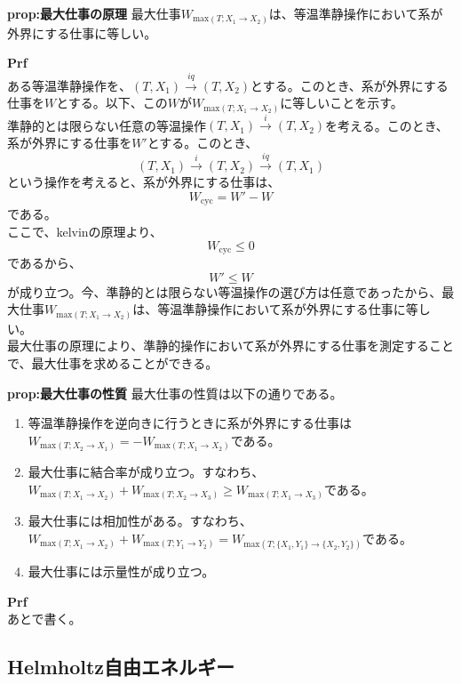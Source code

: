 \documentclass[a4paper,11pt]{jsarticle}
\begin{document}
\begin{itembox}[l]{\textbf{prop:最大仕事の原理}}
    最大仕事$W_{\text{max}(T;X_1\rightarrow X_2)}$は、等温準静操作において系が外界にする仕事に等しい。
\end{itembox}
\textbf{Prf}\\
ある等温準静操作を、$(T,X_1) \xrightarrow{iq} (T,X_2)$とする。このとき、系が外界にする仕事を$W$とする。以下、この$W$が$W_{\text{max}(T;X_1\rightarrow X_2)}$に等しいことを示す。\\
準静的とは限らない任意の等温操作$(T,X_1) \xrightarrow{i} (T,X_2)$を考える。このとき、系が外界にする仕事を$W'$とする。このとき、
\begin{equation}
    (T,X_1) \xrightarrow{i} (T,X_2) \xrightarrow{iq} (T,X_1)
\end{equation}
という操作を考えると、系が外界にする仕事は、
\begin{equation}
    W_{\text{cyc}} = W'-W
\end{equation}
である。\\
ここで、kelvinの原理より、
\begin{equation}
    W_{\text{cyc}} \leq 0
\end{equation}
であるから、
\begin{equation}
    W' \leq W
\end{equation}
が成り立つ。今、準静的とは限らない等温操作の選び方は任意であったから、最大仕事$W_{\text{max}(T;X_1\rightarrow X_2)}$は、等温準静操作において系が外界にする仕事に等しい。\\

最大仕事の原理により、準静的操作において系が外界にする仕事を測定することで、最大仕事を求めることができる。\\

\begin{itembox}[l]{\textbf{prop:最大仕事の性質}}
    最大仕事の性質は以下の通りである。
    \begin{enumerate}
        \item 等温準静操作を逆向きに行うときに系が外界にする仕事は$W_{\text{max}(T;X_2\rightarrow X_1)}=-W_{\text{max}(T;X_1\rightarrow X_2)}$である。
        \item 最大仕事に結合率が成り立つ。すなわち、$W_{\text{max}(T;X_1\rightarrow X_2)}+W_{\text{max}(T;X_2\rightarrow X_3)} \geq W_{\text{max}(T;X_1\rightarrow X_3)}$である。
        \item 最大仕事には相加性がある。すなわち、$W_{\text{max}(T;X_1\rightarrow X_2)}+W_{\text{max}(T;Y_1\rightarrow Y_2)} = W_{\text{max}(T;\{X_1,Y_1\}\rightarrow \{X_2,Y_2\})}$である。
        \item 最大仕事には示量性が成り立つ。
    \end{enumerate}
\end{itembox}
\textbf{Prf}\\
あとで書く。\\

\subsection{Helmholtz自由エネルギー}
\end{document}
